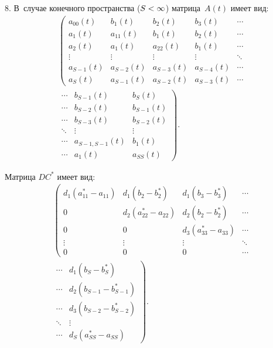 \begin{multicols}{2}
8. В~случае конечного пространства ($S \hm< \infty$) матрица~$A\left( t\right)$ 
имеет вид:
\begin{multline*}
\left(
\begin{array}{ccccc}
a_{00}(t)  & b_1(t)     & b_2(t)     & b_3(t)     &\cdots   \\
a_1(t)     & a_{11}(t)  & b_1(t)     & b_2(t)     &\cdots  \\
a_2(t)     & a_1(t)     & a_{22}(t)  & b_1(t)     & \cdots \\
\vdots     & \vdots     & \vdots     & \vdots     & \ddots\\
a_{S-1}(t) & a_{S-2}(t) & a_{S-3}(t) & a_{S-4}(t) & \cdots\\
a_{S}(t)   & a_{S-1}(t) & a_{S-2}(t) & a_{S-3}(t) & \cdots
\end{array}
\right.\\
\left.
\begin{array}{ccc}
\cdots  & b_{S-1}(t)     & b_{S}(t) \\
\cdots  & b_{S-2}(t)     & b_{S-1}(t) \\
 \cdots & b_{S-3}(t)     & b_{S-2}(t) \\
 \ddots & \vdots         & \vdots \\
\cdots & a_{S-1,S-1}(t) & b_1(t) \\
 \cdots & a_1(t)         & a_{SS}(t)
\end{array}
\right).
\end{multline*}

\noindent 
Матрица $DC^{*}$ имеет вид:
\begin{multline*}
\left(
\begin{array}{cccc}
d_1\left( a_{11}^*- a_{11}\right)              & d_1\left( b_2-
b_2^*\right)                 & d_1\left( b_3-b_3^*\right)             & 
\cdots \\
0                                                   & d_2\left( a_{22}^*- 
a_{22}\right)          & d_2\left( b_2-b_2^*\right)             & \cdots \\
0                                                   & 0                                               
& d_3\left( a_{33}^*- a_{33}\right)      & \cdots \\
\vdots                                              & \vdots                                          
& \vdots                                      & \ddots \\
0             & 0            & 0            & \cdots 
 \end{array}
\right.\\
\left.
\begin{array}{cc}
\cdots & d_1\left( b_S-b_S^*\right)\\
\cdots & 
d_2\left( b_{S-1}-b_{S-1}^*\right)\\
\cdots & d_3\left( b_{S-2}-
b_{S-2}^*\right)\\
 \ddots & \vdots\\
 \cdots & d_S\left( a_{SS}^*- 
a_{SS}\right)
 \end{array}
\right)\!.
\end{multline*}


\end{multicols}
